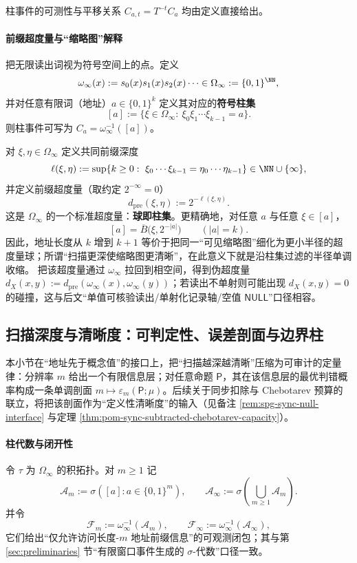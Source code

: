 柱事件的可测性与平移关系 $C_{a,t}=T^{-t}C_a$ 均由定义直接给出。

\paragraph{前缀超度量与“缩略图”解释}\label{par:spg-prefix-ultrametric}
把无限读出词视为符号空间上的点。定义
\[
\omega_\infty(x):=s_0(x)s_1(x)s_2(x)\cdots\in\Omega_\infty:=\{0,1\}^{\NN},
\]
并对任意有限词（地址）$a\in\{0,1\}^k$ 定义其对应的\textbf{符号柱集}
\[
[a]:=\{\xi\in\Omega_\infty:\ \xi_0\xi_1\cdots\xi_{k-1}=a\}.
\]
则柱事件可写为 $C_a=\omega_\infty^{-1}([a])$。
\par
对 $\xi,\eta\in\Omega_\infty$ 定义共同前缀深度
\[
\ell(\xi,\eta):=\sup\{k\ge 0:\ \xi_0\cdots\xi_{k-1}=\eta_0\cdots\eta_{k-1}\}\in\NN\cup\{\infty\},
\]
并定义前缀超度量（取约定 $2^{-\infty}=0$）
\[
d_{\mathrm{pre}}(\xi,\eta):=2^{-\ell(\xi,\eta)}.
\]
这是 $\Omega_\infty$ 的一个标准超度量：\textbf{球即柱集}。更精确地，对任意 $a$ 与任意 $\xi\in[a]$，
\[
[a]=\overline{B}\bigl(\xi,2^{-|a|}\bigr)\qquad(|a|=k).
\]
因此，地址长度从 $k$ 增到 $k{+}1$ 等价于把同一“可见缩略图”细化为更小半径的超度量球；所谓“扫描更深使缩略图更清晰”，在此意义下就是沿柱集过滤的半径单调收缩。
把该超度量通过 $\omega_\infty$ 拉回到相空间，得到伪超度量 $d_X(x,y):=d_{\mathrm{pre}}(\omega_\infty(x),\omega_\infty(y))$；若读出不单射则可能出现 $d_X(x,y)=0$ 的碰撞，这与后文“单值可核验读出/单射化记录轴/空值 $\mathsf{NULL}$”口径相容。

\subsection{扫描深度与清晰度：可判定性、误差剖面与边界柱}\label{subsec:spg-scan-clarity}
本小节在“地址先于概念值”的接口上，把“扫描越深越清晰”压缩为可审计的定量律：分辨率 $m$ 给出一个有限信息层；对任意命题 $\mathsf P$，其在该信息层的最优判错概率构成一条单调剖面 $m\mapsto \varepsilon_m(\mathsf P;\mu)$。后续关于同步扣除与 Chebotarev 预算的联立，将把该剖面作为“定义性清晰度”的输入（见备注 \ref{rem:spg-sync-null-interface} 与定理 \ref{thm:pom-sync-subtracted-chebotarev-capacity}）。

\paragraph{柱代数与闭开性}
令 $\tau$ 为 $\Omega_\infty$ 的积拓扑。对 $m\ge 1$ 记
\[
\mathcal{A}_m:=\sigma([a]:a\in\{0,1\}^m),
\qquad
\mathcal{A}_\infty:=\sigma\!\left(\bigcup_{m\ge 1}\mathcal{A}_m\right).
\]
并令
\[
\mathcal{F}_m:=\omega_\infty^{-1}(\mathcal{A}_m),
\qquad
\mathcal{F}_\infty:=\omega_\infty^{-1}(\mathcal{A}_\infty),
\]
它们给出“仅允许访问长度-$m$ 地址前缀信息”的可观测闭包；其与第 \ref{sec:preliminaries} 节“有限窗口事件生成的 $\sigma$-代数”口径一致。

